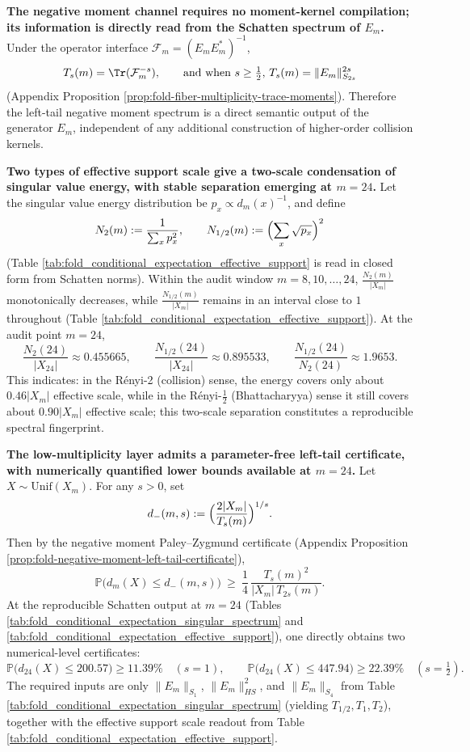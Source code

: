 \medskip\noindent\textbf{The negative moment channel requires no moment-kernel compilation; its information is directly read from the Schatten spectrum of \(E_m\).}
Under the operator interface \(\mathcal{F}_m=(E_mE_m^\ast)^{-1}\),
\[
T_s(m)=\Tr(\mathcal{F}_m^{-s}),
\qquad
\text{and when }s\ge \tfrac12\text{, }T_s(m)=\|E_m\|_{S_{2s}}^{2s}
\]
(Appendix Proposition \ref{prop:fold-fiber-multiplicity-trace-moments}).
Therefore the left-tail negative moment spectrum is a direct semantic output of the generator \(E_m\), independent of any additional construction of higher-order collision kernels.

\medskip\noindent\textbf{Two types of effective support scale give a two-scale condensation of singular value energy, with stable separation emerging at \(m=24\).}
Let the singular value energy distribution be \(p_x\propto d_m(x)^{-1}\), and define
\[
N_2(m):=\frac{1}{\sum_x p_x^2},
\qquad
N_{1/2}(m):=\Bigl(\sum_x\sqrt{p_x}\Bigr)^2
\]
(Table \ref{tab:fold_conditional_expectation_effective_support} is read in closed form from Schatten norms).
Within the audit window \(m=8,10,\dots,24\), \(\frac{N_2(m)}{|X_m|}\) monotonically decreases, while \(\frac{N_{1/2}(m)}{|X_m|}\) remains in an interval close to \(1\) throughout (Table \ref{tab:fold_conditional_expectation_effective_support}).
At the audit point \(m=24\),
\[
\frac{N_2(24)}{|X_{24}|}\approx 0.455665,\qquad
\frac{N_{1/2}(24)}{|X_{24}|}\approx 0.895533,\qquad
\frac{N_{1/2}(24)}{N_2(24)}\approx 1.9653.
\]
This indicates: in the R\'enyi-2 (collision) sense, the energy covers only about \(0.46|X_m|\) effective scale, while in the R\'enyi-\(\tfrac12\) (Bhattacharyya) sense it still covers about \(0.90|X_m|\) effective scale; this two-scale separation constitutes a reproducible spectral fingerprint.

\medskip\noindent\textbf{The low-multiplicity layer admits a parameter-free left-tail certificate, with numerically quantified lower bounds available at \(m=24\).}
Let \(X\sim \mathrm{Unif}(X_m)\).
For any \(s>0\), set
\[
d_{-}(m,s):=\Bigl(\frac{2|X_m|}{T_s(m)}\Bigr)^{1/s}.
\]
Then by the negative moment Paley--Zygmund certificate (Appendix Proposition \ref{prop:fold-negative-moment-left-tail-certificate}),
\[
\mathbb{P}\bigl(d_m(X)\le d_{-}(m,s)\bigr)\ \ge\ \frac14\,\frac{T_s(m)^2}{|X_m|\,T_{2s}(m)}.
\]
At the reproducible Schatten output at \(m=24\) (Tables \ref{tab:fold_conditional_expectation_singular_spectrum} and \ref{tab:fold_conditional_expectation_effective_support}), one directly obtains two numerical-level certificates:
\[
\mathbb{P}\bigl(d_{24}(X)\le 200.57\bigr)\ge 11.39\% \quad(s=1),
\qquad
\mathbb{P}\bigl(d_{24}(X)\le 447.94\bigr)\ge 22.39\% \quad(s=\tfrac12).
\]
The required inputs are only \(\|E_m\|_{S_1}\), \(\|E_m\|_{HS}^2\), and \(\|E_m\|_{S_4}\) from Table \ref{tab:fold_conditional_expectation_singular_spectrum} (yielding \(T_{1/2},T_1,T_2\)), together with the effective support scale readout from Table \ref{tab:fold_conditional_expectation_effective_support}.

